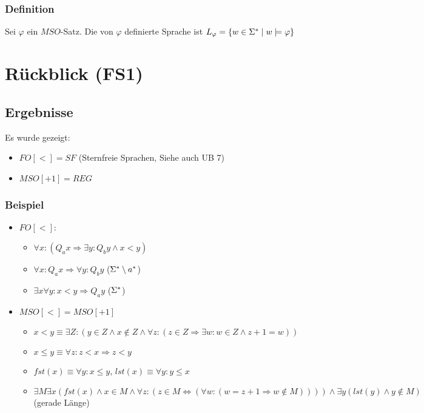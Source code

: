         \subsubsection{Definition}
            Sei $\varphi$ ein $MSO$-Satz. Die von $\varphi$ definierte Sprache ist $L_\varphi=\{w\in\Sigma^*\mid w\models\varphi\}$
    \section{Rückblick (FS1)}
        \subsection{Ergebnisse}
            Es wurde gezeigt: \begin{itemize}
					\item $FO[<]=SF$ (Sternfreie Sprachen, Siehe auch UB 7)
                \item $MSO[+1]=REG$
            \end{itemize}
        \subsubsection{Beispiel}
            \begin{itemize}
                \item $FO[<]:$
                \begin{itemize}
                    \item $\forall x:\left(Q_ax\Rightarrow\exists y:Q_by\wedge x<y\right)$
                    \item $\forall x:Q_ax\Rightarrow\forall y:Q_by$ ($\Sigma^*\setminus a^*$)
                    \item $\exists x\forall y:x<y\Rightarrow Q_ay$ ($\Sigma^*$)
                \end{itemize}
                \item $MSO[<]=MSO[+1]$
                \begin{itemize}
                    \item $x<y\equiv \exists Z:(y\in Z\wedge x\not\in Z\wedge \forall z:(z\in Z\Rightarrow\exists w:w\in Z\wedge z+1=w))$
                    \item $x\le y\equiv \forall z: z< x\Rightarrow z< y$
                    \item $fst(x)\equiv \forall y: x\le y$, $lst(x)\equiv \forall y: y\le x$
                    \item $\exists M\exists x\left(fst(x)\wedge x\in M\wedge\forall z:\left(z\in M\Leftrightarrow\left(\forall w:(w=z+1\Rightarrow w\not\in M)\right)\right)\right)\wedge \exists y(lst(y)\wedge y\not\in M)$ (gerade Länge)
                \end{itemize}
            \end{itemize}

